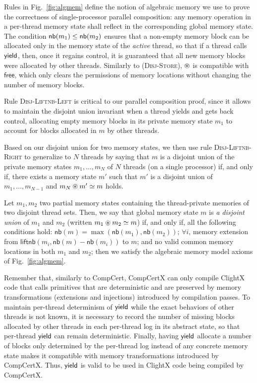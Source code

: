 Rules in Fig.~\ref{fig:algmem} define the notion of algebraic memory
we use to prove the correctness of single-processor parallel
composition: any memory operation in a per-thread memory state shall
reflect in the corresponding global memory state. The condition
$\mathsf{nb}({m_1}) \leq \mathsf{nb}({m_2})$ ensures that a non-empty memory
block can be allocated only in the memory state of the \emph{active}
thread, so that if a thread calls $\mathsf{yield}$, then, once it regains
control, it is guaranteed that all new memory blocks were allocated by
other threads. Similarly to (\textsc{Disj-Store}), $\circledast$
is compatible with $\mathsf{free}$, which only clears the permissions
of memory locations without changing the number of memory blocks.

Rule \textsc{Disj-Liftnb-Left} is critical to our parallel composition
proof, since it allows to maintain the disjoint union invariant when a
thread yields and gets back control, allocating empty memory blocks in
its private memory state $m_1$ to account for blocks allocated in $m$
by other threads.

Based on our disjoint union for two memory states, we then use rule
\textsc{Disj-Liftnb-Right} to generalize to $N$ threads by saying that
$m$ is a disjoint union of the private memory states $m_1, \dots, m_N$
of $N$ threads (on a single processor) if, and only if, there exists a
memory state $m'$ such that $m'$ is a disjoint union of $m_1, \dots,
m_{N-1}$ and ${m_N} \circledast {m'} \simeq {m}$ holds.

\begin{lemma}
Let $m_1, m_2$ two partial memory states containing the thread-private memories of two disjoint thread sets. Then, we say that global memory state $m$ is \emph{a disjoint union} of $m_1$ and $m_2$ (written ${m_1} \circledast {m_2} \simeq {m}$) if, and only if, all the following conditions hold:
$\mathsf{nb}(m) = \max(\mathsf{nb}(m_1), \mathsf{nb}(m_2))$; $\forall i$, memory extension from $\mathsf{liftnb}(m_i, \mathsf{nb}(m) - \mathsf{nb}(m_i))$ to $m$; and no valid common memory locations in both $m_1$ and $m_2$; then we satisfy the algebraic memory model axioms of Fig.~\ref{fig:algmem}.
\end{lemma}

Remember that, similarly to CompCert, CompCertX can only compile
ClightX code that calls primitives that are deterministic and are
preserved by memory transformations (extensions and injections)
introduced by compilation passes. To maintain per-thread determinism
of $\mathsf{yield}$ while the exact behaviors of other threads is not
known, it is necessary to record the number of missing blocks
allocated by other threads in each per-thread log in its abstract
state, so that per-thread $\mathsf{yield}$ can remain
deterministic. Finally, having $\mathsf{yield}$ allocate a number of
blocks only determined by the per-thread log instead of any concrete
memory state makes it compatible with memory transformations
introduced by CompCertX. Thus, $\mathsf{yield}$ is valid to be used in
ClightX code being compiled by CompCertX.
